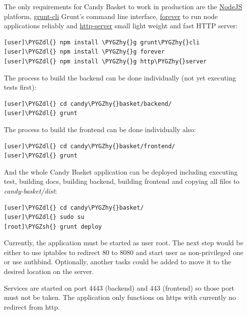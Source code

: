 \documentclass[letterpaper,10pt,english]{sphinxmanual}
\def\PYGZsh{\char`\#}
\def\PYGZdl{\char`\$}
\def\PYGZhy{\char`\-}
\begin{document}
The only requirements for Candy Basket to work in production are the
\href{http://nodejs.org/}{NodeJS} platform, \href{https://github.com/gruntjs/grunt-cli}{grunt-cli} Grunt's command line
interface, \href{https://github.com/foreverjs/forever}{forever} to run
node applications reliably and \href{https://www.npmjs.com/package/http-server}{http-server} small light weight and
fast HTTP server:

\begin{Verbatim}[commandchars=\\\{\}]
[user]\PYGZdl{} npm install \PYGZhy{}g grunt\PYGZhy{}cli
[user]\PYGZdl{} npm install \PYGZhy{}g forever
[user]\PYGZdl{} npm install \PYGZhy{}g http\PYGZhy{}server
\end{Verbatim}

The process to build the backend can be done individually (not yet
executing tests first):

\begin{Verbatim}[commandchars=\\\{\}]
[user]\PYGZdl{} cd candy\PYGZhy{}basket/backend/
[user]\PYGZdl{} grunt
\end{Verbatim}

The process to build the frontend can be done individually also:

\begin{Verbatim}[commandchars=\\\{\}]
[user]\PYGZdl{} cd candy\PYGZhy{}basket/frontend/
[user]\PYGZdl{} grunt
\end{Verbatim}

And the whole Candy Basket application can be deployed including
executing test, building docs, building backend, building frontend and
copying all files to \emph{candy-basket/dist}:

\begin{Verbatim}[commandchars=\\\{\}]
[user]\PYGZdl{} cd candy\PYGZhy{}basket/
[user]\PYGZdl{} sudo su
[root]\PYGZsh{} grunt deploy
\end{Verbatim}

Currently, the application must be started as user root. The next step
would be either to use iptables to redirect 80 to 8080 and start user
as non-privileged one or use authbind. Optionally, another tasks could
be added to move it to the desired location on the server.

Services are started on port 4443 (backend) and 443 (frontend) so
those port must not be taken. The application only functions on https
with currently no redirect from http.
\end{document}
